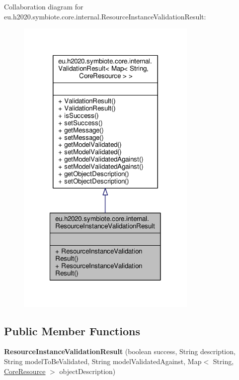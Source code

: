 Collaboration diagram for eu.\+h2020.\+symbiote.\+core.\+internal.\+Resource\+Instance\+Validation\+Result\+:\nopagebreak
\begin{figure}[H]
\begin{center}
\leavevmode
\includegraphics[width=246pt]{classeu_1_1h2020_1_1symbiote_1_1core_1_1internal_1_1ResourceInstanceValidationResult__coll__graph}
\end{center}
\end{figure}
\subsection*{Public Member Functions}
\begin{DoxyCompactItemize}
\item 
\mbox{\label{classeu_1_1h2020_1_1symbiote_1_1core_1_1internal_1_1ResourceInstanceValidationResult_a1de4c427fcc1bb7ac2203fd44ccfe7c2}} 
{\bfseries Resource\+Instance\+Validation\+Result} (boolean success, String description, String model\+To\+Be\+Validated, String model\+Validated\+Against, Map$<$ String, \hyperlink{classeu_1_1h2020_1_1symbiote_1_1core_1_1internal_1_1CoreResource}{Core\+Resource} $>$ object\+Description)
\end{DoxyCompactItemize}


